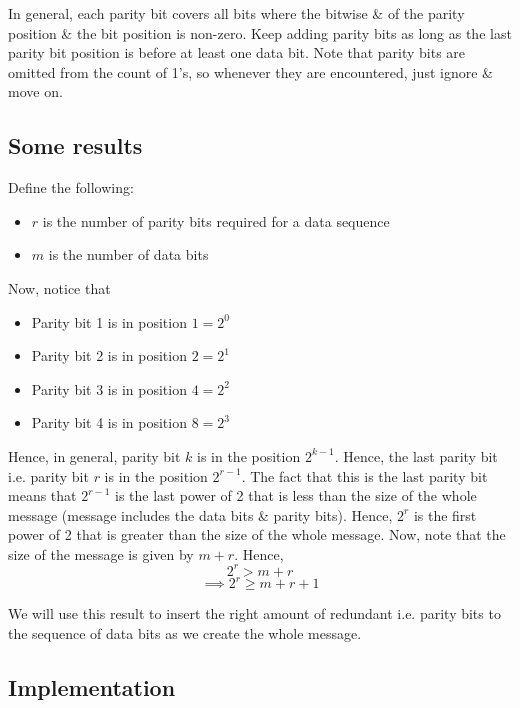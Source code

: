 In general, each parity bit covers all bits where the bitwise \& of the parity position \& the bit position is non-zero. Keep adding parity bits as long as the last parity bit position is before at least one data bit. Note that parity bits are omitted from the count of 1's, so whenever they are encountered, just ignore \& move on.

\subsection{Some results}
Define the following:

\begin{itemize}
	\item $r$ is the number of parity bits required for a data sequence
	\item $m$ is the number of data bits
\end{itemize}

Now, notice that

\begin{itemize}
	\item Parity bit 1 is in position $1=2^0$
	\item Parity bit 2 is in position $2=2^1$
	\item Parity bit 3 is in position $4=2^2$
	\item Parity bit 4 is in position $8=2^3$
\end{itemize}

Hence, in general, parity bit $k$ is in the position $2^{k-1}$. Hence, the last parity bit i.e. parity bit $r$ is in the position $2^{r-1}$. The fact that this is the last parity bit means that $2^{r-1}$ is the last power of 2 that is less than the size of the whole message (message includes the data bits \& parity bits). Hence, $2^r$ is the first power of 2 that is greater than the size of the whole message. Now, note that the size of the message is given by $m+r$. Hence,
\[2^r > m+r\]
\begin{equation}\implies 2^r \geq m+r+1\end{equation}

We will use this result to insert the right amount of redundant i.e. parity bits to the sequence of data bits as we create the whole message.

\subsection{Implementation}



